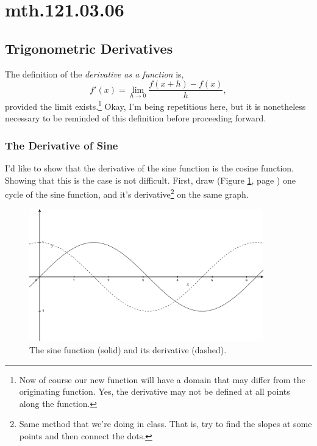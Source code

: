 \documentclass[12pt,addpoints, answers, fleqn]{exam}
\begin{document}
\section{mth.121.03.06}
\subsection{Trigonometric Derivatives}

The definition of the \emph{derivative as a function} is,
\[
f' \left( x \right) = \mathop {\lim }\limits_{h \to 0 }  \frac{f \left( x+h \right) - f \left( x \right)}{h},
\]
provided the limit exists.\footnote{Now of course our new function will have a domain that may differ from the originating function. Yes, the derivative may not be defined at all points along the function.} Okay, I'm being repetitious here, but it is nonetheless necessary to be reminded of this definition before proceeding forward.


\subsubsection{The Derivative of Sine}


I'd like to show that the derivative of the sine function is the cosine function. Showing that this is the case is not difficult. First, draw (Figure \ref{fig:graph1401}, page \pageref{fig:graph1401}) one cycle of the sine function, and it's derivative\footnote{Same method that we're doing in class. That is, try to find the slopes at some points and then connect the dots.} on the same graph.
\begin{figure}[htbp] %
   \centering
   \includegraphics[width=4in]{./graphics/graph1401.pdf} 
   \caption{The sine function (solid) and its derivative (dashed).}
   \label{fig:graph1401}
\end{figure}
\end{document}
